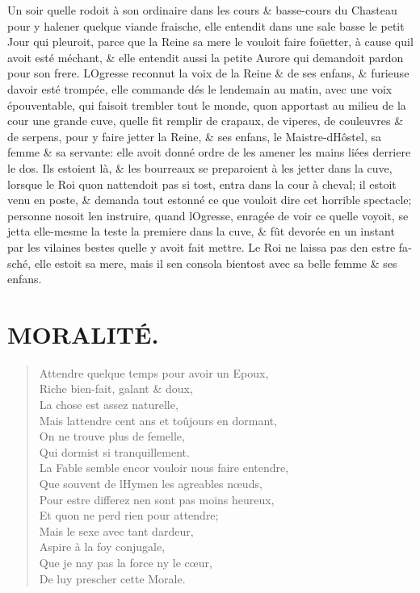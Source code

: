 \documentclass[14pt,a4paper]{memoir}
\newcommand{\notesection}[1]{%
  \addtonotes{\protect\par\protect\vspace{2ex}\protect\noindent\textbf{#1}\protect\par\protect\vspace{1ex}}%
}
\begin{document}
{{\begin{otherlanguage}{french}
Un soir qu\textquotesingle elle rodoit à son ordinaire dans les cours \&
basse-cours du Chasteau pour y halener quelque viande fraische, elle
entendit dans une sale basse le petit Jour qui pleuroit, parce que la
Reine sa mere le vouloit faire foüetter, à cause qu\textquotesingle il
avoit esté méchant, \& elle entendit aussi la petite Aurore qui
demandoit pardon pour son frere. L\textquotesingle Ogresse reconnut la
voix de la Reine \& de ses enfans, \& furieuse d\textquotesingle avoir
esté trompée, elle commande dés le lendemain au matin, avec une voix
épouventable, qui faisoit trembler tout le monde, qu\textquotesingle on
apportast au milieu de la cour une grande cuve, qu\textquotesingle elle
fit remplir de crapaux, de viperes, de couleuvres \& de serpens, pour y
faire jetter la Reine, \& ses enfans, le
Maistre-d\textquotesingle Hôstel, sa femme \& sa servante: elle avoit
donné ordre de les amener les mains liées derriere le dos. Ils estoient
là, \& les bourreaux se preparoient à les jetter dans la cuve, lorsque
le Roi qu\textquotesingle on n\textquotesingle attendoit pas si tost,
entra dans la cour à cheval; il estoit venu en poste, \& demanda tout
estonné ce que vouloit dire cet horrible spectacle; personne
n\textquotesingle osoit l\textquotesingle en instruire, quand
l\textquotesingle Ogresse, enragée de voir ce quelle voyoit, se jetta
elle-mesme la teste la premiere dans la cuve, \& fût devorée en un
instant par les vilaines bestes qu\textquotesingle elle y avoit fait
mettre. Le Roi ne laissa pas d\textquotesingle en estre fasché, elle
estoit sa mere, mais il s\textquotesingle en consola bientost avec sa
belle femme \& ses enfans. \\

\section{MORALITÉ.}
\notesection{MORALITÉ.}

\begin{verse}
  \small
Attendre quelque temps pour avoir un Epoux, \\
Riche bien-fait, galant \& doux,\\
La chose est assez naturelle, \\
Mais l\textquotesingle attendre cent ans et toûjours en dormant,  \\
 On ne trouve plus de femelle, \\
Qui dormist si tranquillement. \\
La Fable semble encor vouloir nous faire entendre, \\
Que souvent de l\textquotesingle Hymen les agreables nœuds,  \\
Pour estre differez n\textquotesingle en sont pas moins heureux,  \\
Et qu\textquotesingle on ne perd rien pour attendre; \\
Mais le sexe avec tant d\textquotesingle ardeur, \\
Aspire à la foy conjugale, \\
Que je n\textquotesingle ay pas la force ny le cœur, \\
De luy prescher cette Morale.
\end{verse}


\end{otherlanguage}}}
\end{document}
